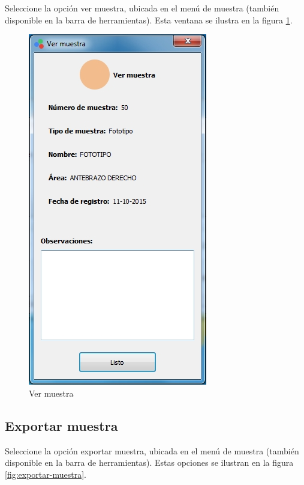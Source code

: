 	Seleccione la opci\'{o}n ver muestra, ubicada en el men\'{u} de muestra (tambi\'{e}n disponible en la barra de herramientas). Esta ventana se ilustra en la figura \ref{fig:ver-muestra}.
\vfill
\begin{figure}[H]
  \centering
  \includegraphics[width=.5\linewidth]{./img/ver-muestra.jpg}
\caption[]{Ver muestra\label{fig:ver-muestra}}
\end{figure}
\vfill
\newpage
	\subsection*{Exportar muestra}
	
	Seleccione la opci\'{o}n exportar muestra, ubicada en el men\'{u} de muestra (tambi\'{e}n disponible en la barra de herramientas). Estas opciones se ilustran en la figura \ref{fig:exportar-muestra}.
	
